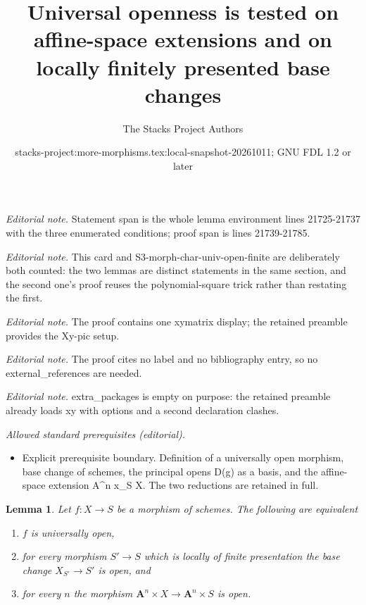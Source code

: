 \documentclass[10pt,a4paper]{amsart}
\title{Universal openness is tested on affine-space extensions and on locally finitely presented base changes}
\author{The Stacks Project Authors}
\date{stacks-project:more-morphisms.tex:local-snapshot-20261011; GNU FDL 1.2 or later}
\theoremstyle{plain}
\newtheorem{lemma}[subsection]{Lemma}
\theoremstyle{definition}
\theoremstyle{remark}
\numberwithin{equation}{subsection}
\begin{document}
\maketitle
\noindent\textit{Editorial note.} Statement span is the whole lemma environment lines 21725-21737 with the three enumerated conditions; proof span is lines 21739-21785.\par\medskip
\noindent\textit{Editorial note.} This card and S3-morph-char-univ-open-finite are deliberately both counted: the two lemmas are distinct statements in the same section, and the second one's proof reuses the polynomial-square trick rather than restating the first.\par\medskip
\noindent\textit{Editorial note.} The proof contains one xymatrix display; the retained preamble provides the Xy-pic setup.\par\medskip
\noindent\textit{Editorial note.} The proof cites no label and no bibliography entry, so no external\_references are needed.\par\medskip
\noindent\textit{Editorial note.} extra\_packages is empty on purpose: the retained preamble already loads xy with options and a second declaration clashes.\par\medskip
\noindent\textit{Allowed standard prerequisites (editorial).}\begin{itemize}
\item Explicit prerequisite boundary. Definition of a universally open morphism, base change of schemes, the principal opens D(g) as a basis, and the affine-space extension A\textasciicircum{}n x\_S X. The two reductions are retained in full.
\end{itemize}\medskip
\begin{lemma}
\label{lemma-test-universally-open}
Let $f : X \to S$ be a morphism of schemes.
The following are equivalent
\begin{enumerate}
\item $f$ is universally open,
\item for every morphism $S' \to S$ which is locally of finite presentation
the base change $X_{S'} \to S'$ is open, and
\item for every $n$ the morphism
$\mathbf{A}^n \times X \to \mathbf{A}^n \times S$
is open.
\end{enumerate}
\end{lemma}
\end{document}

